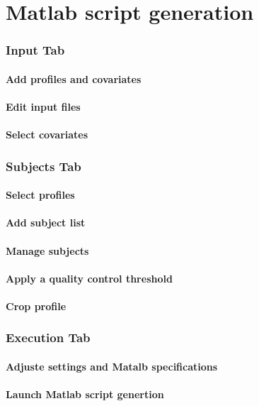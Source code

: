 \documentclass[fadttsterUserGuide_master]{subfiles}
\begin{document}
	\part{Matlab script generation}
	
	\section{Input Tab}
	\subsection{Add profiles and covariates}
	\subsection{Edit input files}
	\subsection{Select covariates}
	
	\section{Subjects Tab}
	\subsection{Select profiles}
	\subsection{Add subject list}
	\subsection{Manage subjects}
	\subsection{Apply a quality control threshold}
	\subsection{Crop profile}
	
	\section{Execution Tab}
	\subsection{Adjuste settings and Matalb\textsuperscript{\textregistered}  specifications}
	\subsection{Launch Matlab script genertion}
\end{document}
